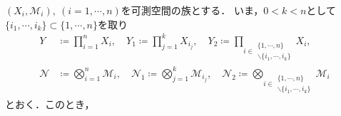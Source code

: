 	$(X_i,\mathcal{M}_i),\ (i=1,\cdots,n)$を可測空間の族とする．
	いま，$0 < k < n$として$\{i_1,\cdots,i_k\} \subset \{1,\cdots,n\}$を取り
	\begin{align}
		Y &\coloneqq \prod_{i=1}^n X_i,
		\quad Y_1 \coloneqq \prod_{j=1}^k X_{i_j},
		\quad Y_2 \coloneqq \prod_{i \in \substack{\{1,\cdots,n\} \\ \backslash \{i_1,\cdots,i_k\}}} X_i, \\
		\mathcal{N} &\coloneqq \bigotimes_{i=1}^n \mathcal{M}_i,
		\quad \mathcal{N}_1 \coloneqq \bigotimes_{j=1}^k \mathcal{M}_{i_j},
		\quad \mathcal{N}_2 \coloneqq \bigotimes_{i \in \substack{\{1,\cdots,n\} \\ \backslash \{i_1,\cdots,i_k\}}} \mathcal{M}_i
	\end{align}
	とおく．このとき，